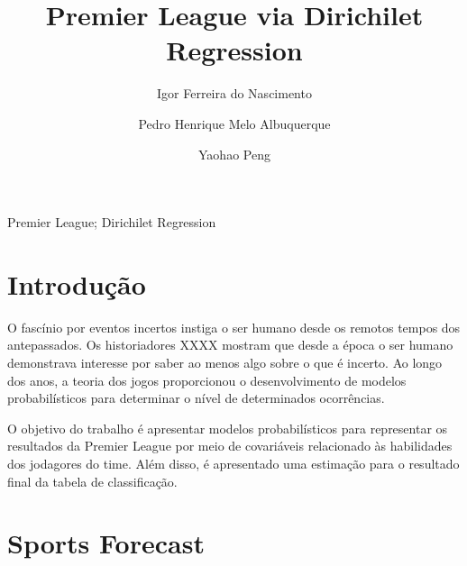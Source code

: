 \documentclass[review]{elsarticle}
\begin{document}
\begin{frontmatter}

\title{Premier League via Dirichilet Regression }

\author[label1,label2]{Igor Ferreira do Nascimento}
\address[label1]{University of Bras{\'{i}}lia, Campus Darcy Ribeiro, Bras{\'{i}}lia, Distrito Federal, 70910--900, Brazil.}
\address[label2]{Piau{\'{i}} Institute of Technology, R. {\'{A}}lvaro Mendes, 94, Teresina, Piau{\'{i}}, 64000--040, Brazil.}
\author[label1]{Pedro Henrique Melo Albuquerque}
\author[label1]{Yaohao Peng}


\begin{abstract}



\end{abstract}

\begin{keyword}
Premier League; Dirichilet Regression
\end{keyword}

\end{frontmatter}

\linenumbers

\newpage

\section{Introdução}
\label{sec:int}
\noindent

O fascínio por eventos incertos instiga o ser humano desde os remotos tempos dos antepassados. Os historiadores XXXX mostram que desde a época o ser humano demonstrava interesse por saber ao menos algo sobre o que é incerto. Ao longo dos anos, a teoria dos jogos proporcionou o desenvolvimento de modelos probabilísticos para determinar o nível de determinados ocorrências.

O objetivo do trabalho é apresentar modelos probabilísticos para representar os resultados da Premier League por meio de covariáveis relacionado às habilidades dos jodagores do time. Além disso, é apresentado uma estimação para o resultado final da tabela de classificação.


\section{Sports Forecast}
\label{sec:foresport}
\noindent
\end{document}
